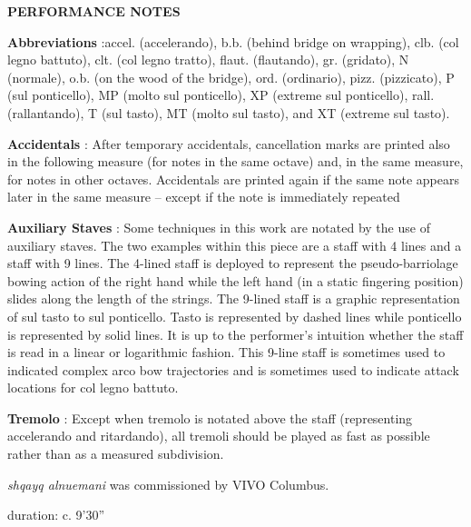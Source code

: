 \documentclass[11pt]{article}
\begin{document}
\begin{center}
\color{myblack}
\huge \textbf{PERFORMANCE NOTES}
\end{center}

\color{black}
\textbf{Abbreviations} :accel. (accelerando), b.b. (behind bridge on wrapping), clb. (col legno battuto), clt. (col legno tratto), flaut. (flautando), gr. (gridato), N (normale), o.b. (on the wood of the bridge),  ord. (ordinario), pizz. (pizzicato), P (sul ponticello), MP (molto sul ponticello), XP (extreme sul ponticello),  rall. (rallantando), T (sul tasto), MT (molto sul tasto), and XT (extreme sul tasto).
\rightskip\leftskip
\phantom{text} \hfill \phantom{()}

\textbf{Accidentals} : After temporary accidentals, cancellation marks are printed also in the following measure (for notes in the same octave) and, in the same measure, for notes in other octaves. Accidentals are printed again if the same note appears later in the same measure – except if the note is immediately repeated
\rightskip\leftskip
\phantom{text} \hfill \phantom{()}

\textbf{Auxiliary Staves} : Some techniques in this work are notated by the use of auxiliary staves. The two examples within this piece are a staff with 4 lines and a staff with 9 lines. The 4-lined staff is deployed to represent the pseudo-barriolage bowing action of the right hand while the left hand (in a static fingering position) slides along the length of the strings. The 9-lined staff is a graphic representation of sul tasto to sul ponticello. Tasto is represented by dashed lines while ponticello is represented by solid lines. It is up to the performer's intuition whether the staff is read in a linear or logarithmic fashion. This 9-line staff is sometimes used to indicated complex arco bow trajectories and is sometimes used to indicate attack locations for col legno battuto.
\rightskip\leftskip
\phantom{text} \hfill \phantom{()}

\textbf{Tremolo} : Except when tremolo is notated above the staff (representing accelerando and ritardando), all tremoli should be played as fast as possible rather than as a measured subdivision.
\rightskip\leftskip
\phantom{text} \hfill \phantom{()}

\vspace*{2\baselineskip}

\begin{center}
\textit{shqayq alnuemani} was commissioned by VIVO Columbus.
\end{center}

\vspace*{2\baselineskip}

\begin{center}
\color{mypink}
duration: c. 9'30''
\end{center}
\end{document}
